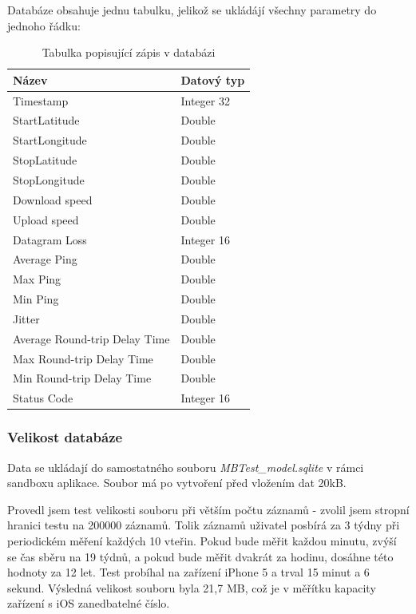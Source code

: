 \newpage

Databáze obsahuje jednu tabulku, jelikož se ukládájí všechny parametry do jednoho řádku:

\begin{table}[h]
	\begin{center}
		\begin{tabular}{|l|l|}
			\hline
				{\bf Název} & {\bf Datový typ}\\
			\hline \hline
				Timestamp & Integer 32\\
				\hline
				StartLatitude & Double\\
				\hline
				StartLongitude & Double\\
				\hline
				StopLatitude & Double\\
				\hline
				StopLongitude & Double\\
				\hline
				Download speed & Double\\
				\hline
				Upload speed & Double\\
				\hline
				Datagram Loss & Integer 16\\
				\hline
				Average Ping & Double\\
				\hline
				Max Ping & Double\\
				\hline
				Min Ping & Double\\
				\hline
				Jitter & Double\\
				\hline
				Average Round-trip Delay Time & Double\\
				\hline
				Max Round-trip Delay Time & Double\\
				\hline
				Min Round-trip Delay Time & Double\\
				\hline
				Status Code & Integer 16\\
				\hline
		\end{tabular}
	\end{center}
	\caption{Tabulka popisující zápis v databázi}
	\label{tab.database}
\end{table}

\subsubsection*{Velikost databáze}
Data se ukládají do samostatného souboru \emph{MBTest\_model.sqlite} v rámci sandboxu aplikace. Soubor má po vytvoření před vložením dat 20kB. 

Provedl jsem test velikosti souboru při větším počtu záznamů - zvolil jsem stropní hranici testu na 200000 záznamů. Tolik záznamů uživatel posbírá za 3 týdny při periodickém měření každých 10 vteřin. Pokud bude měřit každou minutu, zvýší se čas sběru na 19 týdnů, a pokud bude měřit dvakrát za hodinu, dosáhne této hodnoty za 12 let. Test probíhal na zařízení iPhone 5 a trval 15 minut a 6 sekund. Výsledná velikost souboru byla 21,7 MB, což je v měřítku kapacity zařízení s iOS zanedbatelné číslo.

